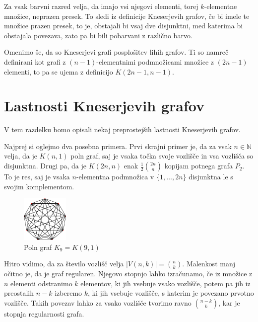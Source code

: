 \documentclass[a4paper,12pt]{article}
\begin{document}
Za vsak barvni razred velja, da imajo vsi njegovi elementi, torej $k$-elementne množice, neprazen presek. To sledi iz definicije Kneserjevih grafov, če bi imele te množice prazen presek, to je, obstajali bi vsaj dve disjunktni, med katerima bi obstajala povezava, zato pa bi bili pobarvani z različno barvo.

Omenimo še, da so Kneserjevi grafi posplošitev lihih grafov. Ti so namreč definirani kot grafi z $(n-1)$-elementnimi podmnožicami množice z $(2n-1)$ elementi, to pa se ujema z definicijo $K(2n-1,n-1)$.


\newpage
\section{Lastnosti Kneserjevih grafov}

V tem razdelku bomo opisali nekaj preprostejših lastnosti Kneserjevih grafov.

Najprej si oglejmo dva posebna primera. Prvi skrajni primer je, da za vsak $n \in \mathbb{N}$ velja, da je $K(n,1)$ poln graf, saj je vsaka točka svoje vozlišče in vsa vozlišča so disjunktna. Drugi pa, da je $K(2n,n)$ enak $\frac{1}{2} {{2n}\choose{n}}$ kopijam potnega grafa $P_2$. To je res, saj je vsaka $n$-elementna podmnožica v $\{1,\ldots,2n\}$ disjunktna le s svojim komplementom.

\begin{figure}[h!]
\centering
\includegraphics[width=0.2\textwidth]{poln_graf}
\caption{Poln graf $K_9=K(9,1)$}
\end{figure}

Hitro vidimo, da za število vozlišč velja $|V(n,k)|={{n}\choose{k}}$. Malenkost manj očitno je, da je graf regularen. Njegovo stopnjo lahko izračunamo, če iz množice z $n$ elementi odstranimo $k$ elementov, ki jih vsebuje vsako vozlišče, potem pa jih iz preostalih $n-k$ izberemo $k$, ki jih vsebuje vozlišče, s katerim je povezano prvotno vozlišče. Takih povezav lahko za vsako vozlišče tvorimo ravno ${n-k}\choose{k}$, kar je stopnja regularnosti grafa.
\end{document}
